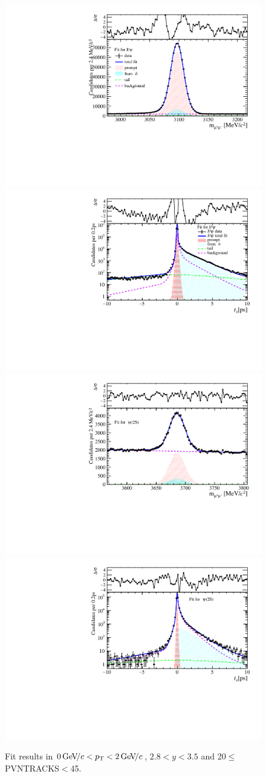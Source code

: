 \begin{figure}[H]
\begin{center}
\includegraphics[width=0.47\linewidth]{pdf/Jpsi/drawmass/n2y2pt1.pdf}
\includegraphics[width=0.47\linewidth]{pdf/Jpsi/2DFit/n2y2pt1.pdf}
\vspace*{-0.5cm}
\includegraphics[width=0.47\linewidth]{pdf/Psi2S/drawmass/n2y2pt1.pdf}
\includegraphics[width=0.47\linewidth]{pdf/Psi2S/2DFit/n2y2pt1.pdf}
\vspace*{-0.5cm}
\end{center}
\caption{Fit results in $0\text{\,Ge\kern -0.1em V\!/}c<p_{\mathrm{T}}<2\text{\,Ge\kern -0.1em V\!/}c$, $2.8<y<3.5$ and 20$\leq$PVNTRACKS$<$45.}
\label{Fitn2y2pt1}
\end{figure}
